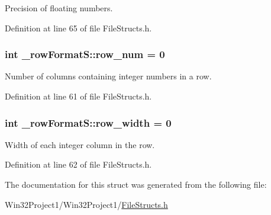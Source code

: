 Precision of floating numbers. 



Definition at line 65 of file File\+Structs.\+h.

\subsubsection[{\texorpdfstring{row\+\_\+num}{row_num}}]{\setlength{\rightskip}{0pt plus 5cm}int \+\_\+row\+Format\+S\+::row\+\_\+num = 0}\hypertarget{struct__row_format_s_ac7451588121fa109b772db97b509e734}{}\label{struct__row_format_s_ac7451588121fa109b772db97b509e734}


Number of columns containing integer numbers in a row. 



Definition at line 61 of file File\+Structs.\+h.

\subsubsection[{\texorpdfstring{row\+\_\+width}{row_width}}]{\setlength{\rightskip}{0pt plus 5cm}int \+\_\+row\+Format\+S\+::row\+\_\+width = 0}\hypertarget{struct__row_format_s_a4f667918f753a059f84301db23d70e68}{}\label{struct__row_format_s_a4f667918f753a059f84301db23d70e68}


Width of each integer column in the row. 



Definition at line 62 of file File\+Structs.\+h.



The documentation for this struct was generated from the following file\+:\begin{DoxyCompactItemize}
\item 
Win32\+Project1/\+Win32\+Project1/\hyperlink{_file_structs_8h}{File\+Structs.\+h}\end{DoxyCompactItemize}
